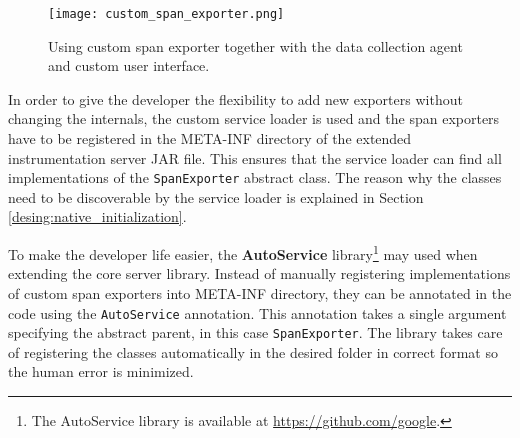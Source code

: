 \begin{figure}
	\centering
	\texttt{[image: custom\_span\_exporter.png]}
	\caption{Using custom span exporter together with the data collection agent and custom user interface.}
	\label{fig:custom_span_exporter}
\end{figure}

In order to give the developer the flexibility to add new exporters without changing the internals, the custom service loader is used and the span exporters have to be registered in the META-INF directory of the extended instrumentation server JAR file. This ensures that the service loader can find all implementations of the \texttt{SpanExporter} abstract class. The reason why the classes need to be discoverable by the service loader is explained in Section \ref{desing:native_initialization}.

To make the developer life easier, the \textbf{AutoService} library\footnote{The AutoService library is available at \url{https://github.com/google}.} may used when extending the core server library. Instead of manually registering implementations of custom span exporters into META-INF directory, they can be annotated in the code using the \texttt{AutoService} annotation. This annotation takes a single argument specifying the abstract parent, in this case \texttt{SpanExporter}. The library takes care of registering the classes automatically in the desired folder in correct format so the human error is minimized.

